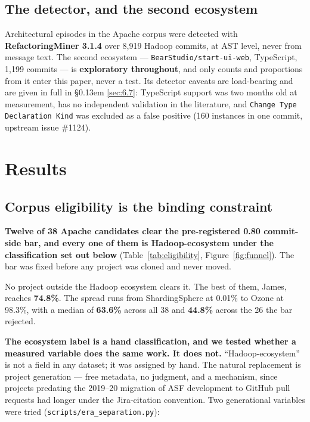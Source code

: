 \documentclass[11pt,a4paper]{article}
\begin{document}
\subsection{The detector, and the second ecosystem}
\label{sec:3.4}

Architectural episodes in the Apache corpus were detected with \textbf{RefactoringMiner 3.1.4} over 8,919 Hadoop commits, at AST level, never from message text. The second ecosystem --- \texttt{BearStudio/\allowbreak{}start-\allowbreak{}ui-\allowbreak{}web}, TypeScript, 1,199 commits --- is \textbf{exploratory throughout}, and only counts and proportions from it enter this paper, never a test. Its detector caveats are load-bearing and are given in full in \S\kern0.13em \ref{sec:6.7}: TypeScript support was two months old at measurement, has no independent validation in the literature, and \texttt{Change Type Declaration Kind} was excluded as a false positive (160 instances in one commit, upstream issue \#1124).


\section{Results}
\label{sec:4}

\subsection{Corpus eligibility is the binding constraint}
\label{sec:4.1}

\textbf{Twelve of 38 Apache candidates clear the pre-registered 0.80 commit-side bar, and every one of them is Hadoop-ecosystem under the classification set out below} (Table~\ref{tab:eligibility}, Figure~\ref{fig:funnel}). The bar was fixed before any project was cloned and never moved.

No project outside the Hadoop ecosystem clears it. The best of them, James, reaches \textbf{74.8\%}. The spread runs from ShardingSphere at 0.01\% to Ozone at 98.3\%, with a median of \textbf{63.6\%} across all 38 and \textbf{44.8\%} across the 26 the bar rejected.

\textbf{The ecosystem label is a hand classification, and we tested whether a measured variable does the same work. It does not.} ``Hadoop-ecosystem'' is not a field in any dataset; it was assigned by hand. The natural replacement is project generation --- free metadata, no judgment, and a mechanism, since projects predating the 2019--20 migration of ASF development to GitHub pull requests had longer under the Jira-citation convention. Two generational variables were tried (\texttt{scripts/\allowbreak{}era\_\allowbreak{}separation.\allowbreak{}py}):
\end{document}
